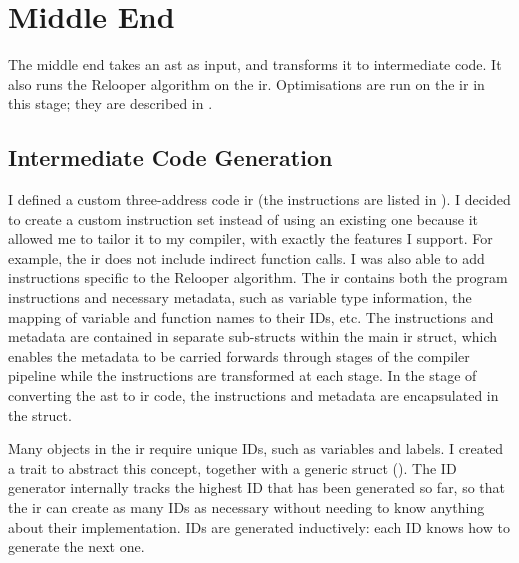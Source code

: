 \documentclass[00-main.tex]{subfiles}
\begin{document}
\section{Middle End}

The middle end takes an \gls{ast} as input, and transforms it to intermediate code.
It also runs the Relooper algorithm on the \gls{ir}.
Optimisations are run on the \gls{ir} in this stage; they are described in .

\subsection{Intermediate Code Generation}

I defined a custom three-address code \gls{ir} (the instructions are listed in ).
I decided to create a custom instruction set instead of using an existing one because it allowed me to tailor it to my compiler, with exactly the features I support. For example, the \gls{ir} does not include indirect function calls.
I was also able to add instructions specific to the Relooper algorithm.
The \gls{ir} contains both the program instructions and necessary metadata, such as variable type information, the mapping of variable and function names to their IDs, etc.
The instructions and metadata are contained in separate sub-structs within the main \gls{ir} struct, which enables the metadata to be carried forwards through stages of the compiler pipeline while the instructions are transformed at each stage.
In the stage of converting the \gls{ast} to \gls{ir} code, the instructions and metadata are encapsulated in the  struct.

Many objects in the \gls{ir} require unique IDs, such as variables and labels.
I created a  trait to abstract this concept, together with a generic  struct ().
The ID generator internally tracks the highest ID that has been generated so far, so that the \gls{ir} can create as many IDs as necessary without needing to know anything about their implementation.
IDs are generated inductively: each ID knows how to generate the next one.
\end{document}
